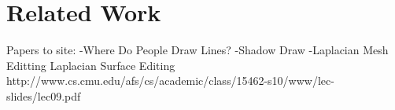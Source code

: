 \section{Related Work}

Papers to site:
-Where Do People Draw Lines?
-Shadow Draw
-Laplacian Mesh Editting
Laplacian Surface Editing
http://www.cs.cmu.edu/afs/cs/academic/class/15462-s10/www/lec-slides/lec09.pdf

